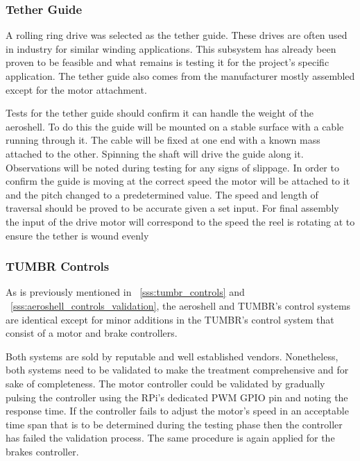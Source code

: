 \subsubsection{Tether Guide}

\indent\indent A rolling ring drive was selected as the tether guide. These drives are often used in industry for similar winding applications. This subsystem has already been proven to be feasible and what remains is testing it for the project’s specific application. The tether guide also comes from the manufacturer mostly assembled except for the motor attachment.

\indent\indent Tests for the tether guide should confirm it can handle the weight of the aeroshell. To do this the guide will be mounted on a stable surface with a cable running through it. The cable will be fixed at one end with a known mass attached to the other. Spinning the shaft will drive the guide along it. Observations will be noted during testing for any signs of slippage. In order to confirm the guide is moving at the correct speed the motor will be attached to it and the pitch changed to a predetermined value. The speed and length of traversal should be proved to be accurate given a set input. For final assembly the input of the drive motor will correspond to the speed the reel is rotating at to ensure the tether is wound evenly



\subsubsection{TUMBR Controls}

\indent\indent  As is previously mentioned in ~\ref{sss:tumbr_controls} and ~\ref{sss:aeroshell_controls_validation}, the aeroshell and TUMBR's control systems are identical except for minor additions in the TUMBR's control system that consist of a motor and brake controllers.

Both systems are sold by reputable and well established vendors. Nonetheless, both systems need to be validated to make the treatment comprehensive and for sake of completeness. The motor controller could be validated by gradually pulsing the controller using the RPi's dedicated PWM GPIO pin and noting the response time. If the controller fails to adjust the motor's speed in an acceptable time span that is to be determined during the testing phase then the controller has failed the validation process. The same procedure is again applied for the brakes controller.

